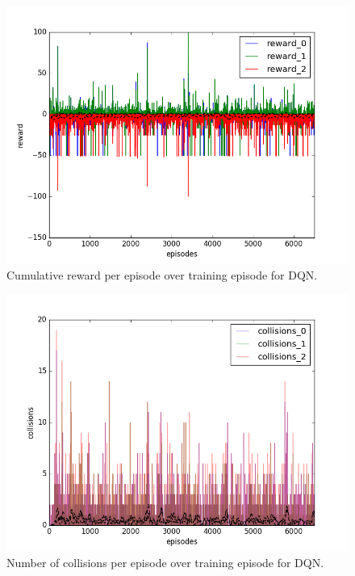 \begin{figure}[h]
  \centering
  \includegraphics[trim=10 10 10 10,clip,width=\figscale\linewidth]
  {../results/dqn_1vs2/reward.png}
  \caption{Cumulative reward per episode over training episode for DQN.}
  \label{fig:dqn-1vs2}
\end{figure}
\FloatBarrier


\begin{figure}[h]
  \centering
  \includegraphics[trim=10 10 10 10,clip,width=\figscale\linewidth]
  {../results/dqn_1vs2/collisions.png}
  \caption{Number of collisions per episode over training episode for DQN.}
  \label{fig:dqn-1vs2}
\end{figure}
\FloatBarrier



